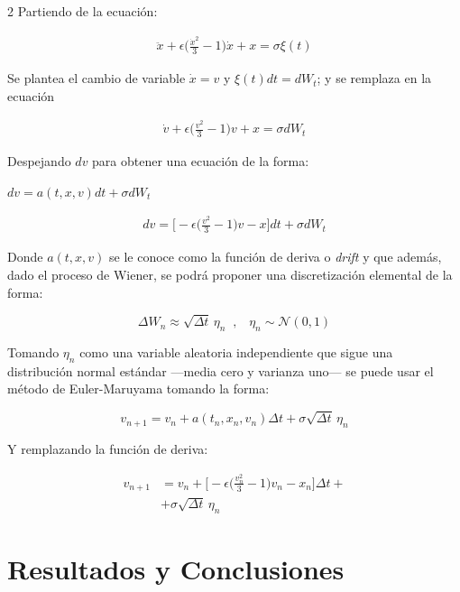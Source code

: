 \begin{multicols}{2}
    Partiendo de la ecuación:
    
    \begin{align*}
        \ddot{x} + \epsilon \Bigg(\frac{\dot{x}^2}{3} - 1 \Bigg)\dot{x} + x = \sigma \xi(t)
    \end{align*}

    Se plantea el cambio de variable $\dot{x} = v$ y $\xi(t) dt = dW_t$; y se remplaza en la ecuación

    \begin{align*}
        \dot{v} + \epsilon \Bigg(\frac{v^2}{3} - 1 \Bigg)v + x = \sigma dW_t
    \end{align*}

    Despejando $dv$ para obtener una ecuación de la forma:
    
    $dv = a(t,x,v)dt + \sigma dW_t$

    \begin{align*}
        dv =\Bigg[- \epsilon \Bigg(\frac{v^2}{3} - 1 \Bigg)v - x \Bigg]dt + \sigma dW_t
    \end{align*}

    Donde $a(t,x,v)$ se le conoce como la función de deriva o \textit{drift} y que además, dado el proceso de Wiener, se podrá proponer una discretización elemental de la forma:

    \begin{equation*}
        \Delta W_n \approx \sqrt{\Delta t} \,\eta_n \; \; , \hspace{10pt} \eta_n \sim \mathcal{N}(0,1)
    \end{equation*}

    Tomando $\eta_n$ como una variable aleatoria independiente que sigue una distribución normal estándar ---media cero y varianza uno--- se puede usar el método de Euler-Maruyama tomando la forma:

    \begin{equation*}
        v_{n+1} = v_n + a(t_n, x_n, v_n) \Delta t + \sigma \sqrt{\Delta t} \, \eta_n
    \end{equation*}

    Y remplazando la función de deriva:

    \begin{align*}
        v_{n+1} &= v_n  + \Bigg[- \epsilon \Bigg(\frac{v_n^2}{3} - 1 \Bigg)v_n - x_n \Bigg] \Delta t + \\ &+ \sigma \sqrt{\Delta t} \, \eta_n
    \end{align*}

    
\section*{Resultados y Conclusiones}


\end{multicols}
